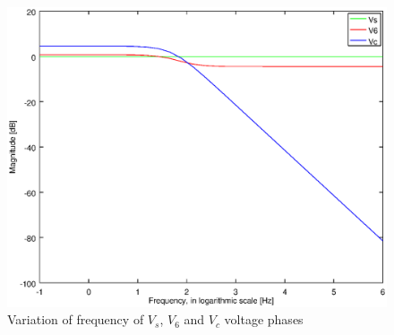 \begin{figure}[!h]
	\centering
	\includegraphics[width=0.7\linewidth]{magnitude.eps}
	\caption{Variation of frequency of $V_s$, $V_6$ and $V_c$ voltage phases}
\end{figure}



